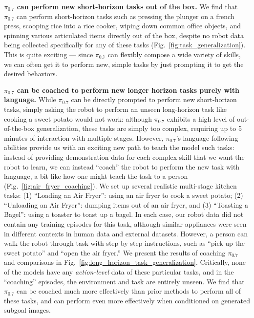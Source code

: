 \documentclass[conference]{IEEEtran}
\def \MethodName {$\pi_{0.7}$}
\begin{document}
\noindent \textbf{\MethodName{} can perform new short-horizon tasks out of the box. }
We find that \MethodName{} can perform short-horizon tasks such as pressing the plunger on a french press, scooping rice into a rice cooker, wiping down common office objects, and spinning various articulated items directly out of the box, despite no robot data being collected specifically for any of these tasks (Fig.~\ref{fig:task_generalization}). This is quite exciting --- since \MethodName{} can flexibly compose a wide variety of skills, we can often get it to perform new, simple tasks by just prompting it to get the desired behaviors.

\noindent \textbf{\MethodName{} can be coached to perform new longer horizon tasks purely with language. }
While \MethodName{} can be directly prompted to perform new short-horizon tasks, simply asking the robot to perform an unseen long-horizon task like cooking a sweet potato would not work: although \MethodName{} exhibits a high level of out-of-the-box generalization, these tasks are simply too complex, requiring up to 5 minutes of interaction with multiple stages. However, \MethodName{}'s language following abilities provide us with an exciting new path to teach the model such tasks: instead of providing demonstration data for each complex skill that we want the robot to learn, we can instead ``coach'' the robot to perform the new task with language, a bit like how one might teach the task to a person (Fig.~\ref{fig:air_fryer_coaching}). We set up several realistic multi-stage kitchen tasks: (1) ``Loading an Air Fryer'': using an air fryer to cook a sweet potato; (2) ``Unloading an Air Fryer'': dumping items out of an air fryer, and (3) ``Toasting a Bagel'': using a toaster to toast up a bagel. In each case, our robot data did not contain any training episodes for this task, although similar appliances were seen in different contexts in human data and external datasets. However, a person can walk the robot through task with step-by-step instructions, such as ``pick up the sweet potato'' and ``open the air fryer.'' We present the results of coaching \MethodName{} and comparisons in Fig.~\ref{fig:long_horizon_task_generalization}. Critically, none of the models have any \emph{action-level} data of these particular tasks, and in the ``coaching'' episodes, the environment and task are entirely unseen. We find that \MethodName{} can be coached much more effectively than prior methods to perform all of these tasks, and can perform even more effectively when conditioned on generated subgoal images.
\end{document}
